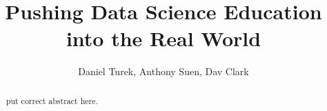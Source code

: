 \documentclass[12pt]{article}
\begin{document}
\title{Pushing Data Science Education\\
into the Real World }
\author{Daniel Turek, Anthony Suen, Dav Clark}
\date{}
\maketitle
{}

\vspace{0.5in}

\begin{abstract}
put correct abstract here.
\end{abstract}

\thispagestyle{empty}
\end{document}
